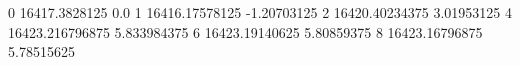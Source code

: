 0 16417.3828125 0.0
1 16416.17578125 -1.20703125
2 16420.40234375 3.01953125
4 16423.216796875 5.833984375
6 16423.19140625 5.80859375
8 16423.16796875 5.78515625
